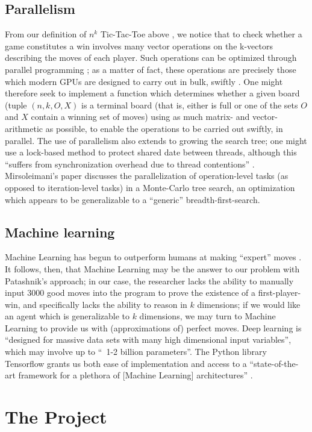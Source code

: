 \documentclass[english, 11pt]{article}
\begin{document}
\subsection{Parallelism}
From our definition of  $n^k$ Tic-Tac-Toe above \cite{krivelevick}, we notice that to check whether a game constitutes a win involves many vector operations on the k-vectors describing the moves of each player. Such operations can be optimized through parallel programming \cite{bsp}; as a matter of fact, these operations are precisely those which modern GPUs are designed to carry out in bulk, swiftly \cite{cuda}. 
One might therefore seek to implement a function which determines whether a given board (tuple $(n, k, O, X)$ is a terminal board (that is, either is full or one of the sets $O$ and $X$ contain a winning set of moves) using as much matrix- and vector- arithmetic as possible, to enable the operations to be carried out swiftly, in parallel.
The use of parallelism also extends to growing the search tree; one might use a lock-based method to protect shared date between threads, although this “suffers from synchronization overhead due to thread contentions” \cite{montecarlo}. Mirsoleimani’s paper discusses the parallelization of operation-level tasks (as opposed to iteration-level tasks) in a Monte-Carlo tree search, an optimization which appears to be generalizable to a “generic” breadth-first-search.
\subsection{Machine learning}
Machine Learning has begun to outperform humans at making “expert” moves \cite{NYT_Go}. It follows, then, that Machine Learning may be the answer to our problem with Patashnik’s approach; in our case, the researcher lacks the ability to manually input 3000 good moves into the program to prove the existence of a first-player-win, and specifically lacks the ability to reason in $k$ dimensions; if we would like an agent which is generalizable to $k$ dimensions, we may turn to Machine Learning to provide us with (approximations of) perfect moves. 
Deep learning is “designed for massive data sets with many high dimensional input variables”, which may involve up to “~1-2 billion parameters”. The Python library Tensorflow grants us both ease of implementation and access to a “state-of-the-art framework for a plethora of [Machine Learning] architectures” \cite{sokolov_polson}. 


\section{The Project}
\end{document}
